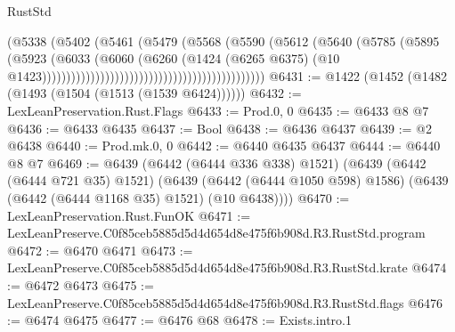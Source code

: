 \begin{lexlean}{RustStd}
\begin{coremodule}
                                                                (@5338
                                                                  (@5402
                                                                    (@5461
                                                                      (@5479
                                                                        (@5568
                                                                          (@5590
                                                                            (@5612
                                                                              (@5640
                                                                                (@5785
                                                                                  (@5895
                                                                                    (@5923
                                                                                      (@6033
                                                                                        (@6060
                                                                                          (@6260
                                                                                            (@1424
                                                                                              (@6265
                                                                                                @6375)
                                                                                              (@10
                                                                                                @1423))))))))))))))))))))))))))))))))))))))))))))))
@6431 := @1422 (@1452 (@1482 (@1493 (@1504 (@1513 (@1539 @6424))))))
@6432 := LexLeanPreservation.Rust.Flags
@6433 := Prod.{0, 0}
@6435 := @6433 @8 @7
@6436 := @6433 @6435
@6437 := Bool
@6438 := @6436 @6437
@6439 := @2 @6438
@6440 := Prod.mk.{0, 0}
@6442 := @6440 @6435 @6437
@6444 := @6440 @8 @7
@6469 := @6439
    (@6442 (@6444 @336 @338) @1521)
    (@6439
      (@6442 (@6444 @721 @35) @1521)
      (@6439 (@6442 (@6444 @1050 @598) @1586) (@6439 (@6442 (@6444 @1168 @35) @1521) (@10 @6438))))
@6470 := LexLeanPreservation.Rust.FunOK
@6471 := LexLeanPreserve.C0f85ceb5885d5d4d654d8e475f6b908d.R3.RustStd.program
@6472 := @6470 @6471
@6473 := LexLeanPreserve.C0f85ceb5885d5d4d654d8e475f6b908d.R3.RustStd.krate
@6474 := @6472 @6473
@6475 := LexLeanPreserve.C0f85ceb5885d5d4d654d8e475f6b908d.R3.RustStd.flags
@6476 := @6474 @6475
@6477 := @6476 @68
@6478 := Exists.intro.{1}

\end{coremodule}
\end{lexlean}
